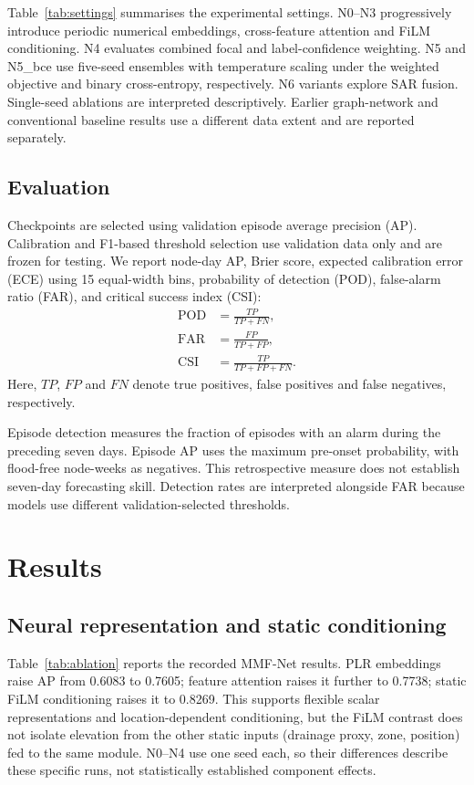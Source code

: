 \documentclass[conference]{IEEEtran}
\newcommand{\model}{MMF-Net}
\newcommand{\bce}{N5\_bce}
\begin{document}
Table~\ref{tab:settings} summarises the experimental settings.
N0--N3 progressively introduce periodic numerical embeddings,
cross-feature attention and FiLM conditioning. N4 evaluates
combined focal and label-confidence weighting. N5 and
\bce{} use five-seed ensembles with temperature scaling
under the weighted objective and binary cross-entropy,
respectively. N6 variants explore SAR fusion.
Single-seed ablations are interpreted descriptively.
Earlier graph-network and conventional baseline results
use a different data extent and are reported separately.

\subsection{Evaluation}

Checkpoints are selected using validation episode average
precision (AP). Calibration and F1-based threshold selection
use validation data only and are frozen for testing.
We report node-day AP, Brier score, expected calibration
error (ECE) using 15 equal-width bins, probability of detection
(POD), false-alarm ratio (FAR), and critical success
index (CSI):
\begin{equation}
\begin{aligned}
\mathrm{POD} &= \frac{TP}{TP+FN}, \\
\mathrm{FAR} &= \frac{FP}{TP+FP}, \\
\mathrm{CSI} &= \frac{TP}{TP+FP+FN}.
\end{aligned}
\end{equation}
Here, $TP$, $FP$ and $FN$ denote true positives,
false positives and false negatives, respectively.

Episode detection measures the fraction of episodes with
an alarm during the preceding seven days. Episode AP
uses the maximum pre-onset probability, with flood-free
node-weeks as negatives. This retrospective measure
does not establish seven-day forecasting skill.
Detection rates are interpreted alongside FAR because
models use different validation-selected thresholds.

\section{Results}

\subsection{Neural representation and static conditioning}
Table~\ref{tab:ablation} reports the recorded \model{} results. PLR
embeddings raise AP from 0.6083 to 0.7605; feature attention raises it
further to 0.7738; static FiLM conditioning raises it to 0.8269. This
supports flexible scalar representations and location-dependent
conditioning, but the FiLM contrast does not isolate elevation from the
other static inputs (drainage proxy, zone, position) fed to the same module.
N0--N4 use one seed each, so their differences describe these specific runs,
not statistically established component effects.
\end{document}
